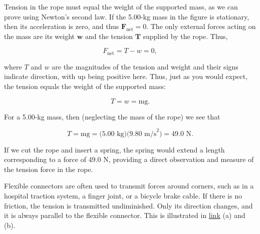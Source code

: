 \documentclass[
]{book}
\begin{document}
Tension in the rope must equal the weight of the supported mass, as we
can prove using Newton's second law. If the 5.00-kg mass in the figure
is stationary, then its acceleration is zero, and thus
\({\textbf{F}_{\text{net}} = 0}{}\). The only external forces acting on
the mass are its weight \(\textbf{w}{}\)\textbf{}
and the tension \(\textbf{T}{}\) supplied by the rope. Thus,

\leavevmode\hypertarget{eip-id2555725}{}%
\[{{F_{\text{net}} = {T - w}} = 0},\]

where \(T{}\)\emph{} and
\(w{}\)\emph{} are the magnitudes of the tension
and weight and their signs indicate direction, with up being positive
here. Thus, just as you would expect, the tension equals the weight of
the supported mass:

\leavevmode\hypertarget{eip-id1640254}{}%
\[{{T = w} = \text{mg}}.\]

For a 5.00-kg mass, then (neglecting the mass of the rope) we see that

\leavevmode\hypertarget{eip-id2489897}{}%
\[{{{T = \text{mg}} = (}\text{5.00\ kg})(9\text{.}\text{80\ m/s}^{2}{) =}\text{49.0\ N}}.\]

If we cut the rope and insert a spring, the spring would extend a length
corresponding to a force of 49.0 N, providing a direct observation and
measure of the tension force in the rope.

Flexible connectors are often used to transmit forces around corners,
such as in a hospital traction system, a finger joint, or a bicycle
brake cable. If there is no friction, the tension is transmitted
undiminished. Only its direction changes, and it is always parallel to
the flexible connector. This is illustrated in
\protect\hyperlink{import-auto-id1318288}{link} (a) and (b).
\end{document}
